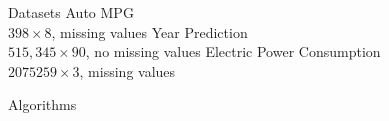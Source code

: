\begin{frame}{Datasets}
\bs
\bi
\mi Auto MPG\\
$398\times8$, missing values
\mi Year Prediction\\
$515,345\times90$, no missing values
\mi Electric Power Consumption\\
$2075259\times3$, missing values
\ei

\end{frame}

\begin{frame}{Algorithms}

\end{frame}
